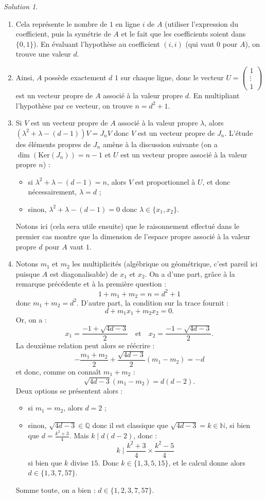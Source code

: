 \documentclass[french]{book}
\newcommand{\N}{\mathbb{N}}
\newcommand{\Q}{\mathbb{Q}}
\renewcommand{\ker}{\text{Ker}}
\theoremstyle{definition}
\theoremstyle{remark}
\newtheorem*{sol}{Solution}
\begin{document}
\begin{sol}
	\begin{enumerate}
		\item Cela représente le nombre de $1$ en ligne $i$ de $A$ (utiliser l'expression du coefficient, puis la symétrie de $A$ et le fait que les coefficients soient dans $\{0,1\}$). En évaluant l'hypothèse au coefficient $(i,i)$ (qui vaut $0$ pour $A$), on trouve une valeur $d$.
		\item Ainsi, $A$ possède exactement $d$ $1$ sur chaque ligne, donc le vecteur $U=\begin{pmatrix}
			1\\
			\vdots\\
			1
		\end{pmatrix}$ est un vecteur propre de $A$ associé à la valeur propre $d$. En multipliant l'hypothèse par ce vecteur, on trouve $n=d^2+1$.
		\item Si $V$ est un vecteur propre de $A$ associé à la valeur propre $\lambda$, alors $(\lambda^2+\lambda-(d-1))V=J_nV$ donc $V$ est un vecteur propre de $J_n$. L'étude des éléments propres de $J_n$ amène à la discussion suivante (on a $\dim(\ker(J_n))=n-1$ et $U$ est un vecteur propre associé à la valeur propre $n$) :
		\begin{itemize}
			\item si $\lambda^2+\lambda-(d-1)=n$, alors $V$ est proportionnel à $U$, et donc nécessairement, $\lambda=d$ ;
			\item sinon, $\lambda^2+\lambda-(d-1)=0$ donc $\lambda\in\{x_1,x_2\}$.
		\end{itemize}
		Notons ici (cela sera utile ensuite) que le raisonnement effectué dans le premier cas montre que la dimension de l'espace propre associé à la valeur propre $d$ pour $A$ vaut $1$.
		\item Notons $m_1$ et $m_2$ les multiplicités (algébrique ou géométrique, c'est pareil ici puisque $A$ est diagonalisable) de $x_1$ et $x_2$. On a d'une part, grâce à la remarque précédente et à la première question :
		$$1+m_1+m_2=n=d^2+1$$ donc $m_1+m_2=d^2$. D'autre part, la condition sur la trace fournit :
		$$d+m_1x_1+m_2x_2=0.$$
		Or, on a :
		$$x_1=\frac{-1+\sqrt{4d-3}}{2}\quad\text{et}\quad x_2=\frac{-1-\sqrt{4d-3}}{2}.$$
		La deuxième relation peut alors se réécrire :
		$$-\frac{m_1+m_2}{2}+\frac{\sqrt{4d-3}}{2}(m_1-m_2)=-d$$ et donc, comme on connaît $m_1+m_2$ :
		$$\sqrt{4d-3}(m_1-m_2)=d(d-2).$$
		Deux options se présentent alors :
		\begin{itemize}
			\item si $m_1=m_2$, alors $d=2$ ;
			\item sinon, $\sqrt{4d-3}\in\Q$ donc il est classique que $\sqrt{4d-3}=k\in\N$, si bien que $d=\displaystyle\frac{k^2+3}{4}$. Mais $k\mid d(d-2)$, donc :
			$$k\mid\frac{k^2+3}{4}\times\frac{k^2-5}{4}$$ si bien que $k$ divise $15$. Donc $k\in\{1,3,5,15\}$, et le calcul donne alors $d\in\{1,3,7,57\}$.
		\end{itemize}
		Somme toute, on a bien : $d\in\{1,2,3,7,57\}$.
	\end{enumerate}
\end{sol}
\end{document}
